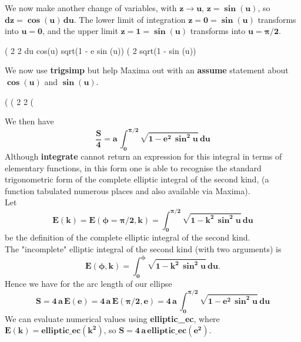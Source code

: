 \documentclass[12pt]{article}
\begin{document}
\noindent We now make another change of variables, with $\mathbf{z \rightarrow u}$,
 $\mathbf{z = \boldsymbol{\sin}(u)}$,
  so $\mathbf{dz = \boldsymbol{\cos}(u) \, du}$.
The lower limit of integration $\mathbf{z = 0 = \boldsymbol{\sin}(u)}$
  transforms into $\mathbf{u = 0}$, and the upper limit $\mathbf{z = 1 = \boldsymbol{\sin}(u)}$
  transforms into $\mathbf{u = \boldsymbol{\pi}/2}$.
\begin{myVerbatim}
(%
                                            2    2
                        du cos(u) sqrt(1 - e  sin (u))
(%
                                          2
                              sqrt(1 - sin (u))
\end{myVerbatim} 
We now use \textbf{trigsimp} but help Maxima out with an \textbf{assume} statement
  about $\mathbf{\boldsymbol{\cos}(u)}$ and $\mathbf{\boldsymbol{\sin}(u)}$.
\begin{myVerbatim}
(%
(%
                                         2    2
(%
\end{myVerbatim} 
We then have
\begin{equation}
\mathbf{\frac{S}{4} = a \, \int_{0}^{\boldsymbol{\pi}/2} \sqrt{1 - e^{2} \, \boldsymbol{\sin}^{2}u } \, du }
\end{equation}
Although \textbf{integrate} cannot return an expression for this integral in
  terms of elementary functions, in this form one is able to recognise the standard
  trigonometric form of the complete elliptic integral of the second kind,
  (a function tabulated numerous places and also available via Maxima).\\  

\noindent Let
\begin{equation}
\mathbf{ E(k) = E(\boldsymbol{\phi} = \boldsymbol{\pi}/2,k) = 
   \int_{0}^{\boldsymbol{\pi}/2} \sqrt{1 - k^{2} \, \boldsymbol{\sin}^{2}u } \, du }
\end{equation}
  be the definition of the complete elliptic integral of the second kind.\\

\noindent The "incomplete" elliptic integral of the second kind (with two arguments) is
\begin{equation}
\mathbf{E(\boldsymbol{\phi},k) = \int_{0}^{\boldsymbol{\phi}} \sqrt{1 - k^{2} \, \boldsymbol{\sin}^{2}u } \, du}.
\end{equation}
Hence we have for the arc length of our ellipse
\begin{equation}
\mathbf{S = 4 \, a \, E(e) = 4 \, a \, E(\boldsymbol{\pi}/2,e) = 4 \, a \,
 \int_{0}^{\boldsymbol{\pi}/2} \sqrt{1 - e^{2} \, \boldsymbol{\sin}^{2}u } \, du}
\end{equation}
We can evaluate numerical values using \textbf{elliptic\_ec}, where\\
  $\mathbf{E(k) = elliptic\_ec(k^2)}$, so $\mathbf{S = 4 \, a\, elliptic\_ec(e^{2}) }$. \\
  
\end{document}
